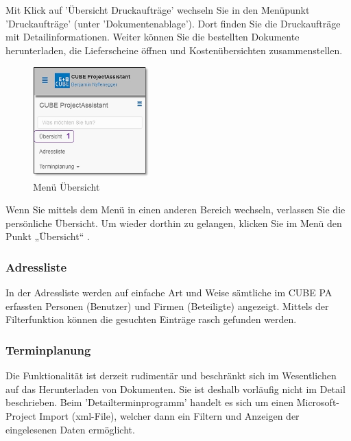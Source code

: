 Mit Klick auf 'Übersicht Druckaufträge' wechseln Sie in den Menüpunkt 'Druckaufträge' (unter 'Dokumentenablage'). Dort finden Sie die Druckaufträge mit Detailinformationen. Weiter können Sie die bestellten Dokumente herunterladen, die Lieferscheine öffnen und Kostenübersichten zusammenstellen.

\vspace{\baselineskip}

\begin{figure}
  \vspace{-30pt}
  \begin{center}
    \includegraphics[width=0.4\textwidth]{../chapters/01_Einfuehrung/pictures/1-3-2_MenuepunktUebersicht.jpg}
  \end{center}
  \vspace{-20pt}
  \caption{Menü Übersicht}
  \vspace{-10pt}
\end{figure}
Wenn Sie mittels dem Menü in einen anderen Bereich wechseln, verlassen Sie die persönliche Übersicht. Um wieder dorthin zu gelangen, klicken Sie im Menü den Punkt „Übersicht“ .

\vspace{4cm} 

\subsubsection{Adressliste}

In der Adressliste werden auf einfache Art und Weise sämtliche im CUBE PA erfassten Personen (Benutzer) und Firmen (Beteiligte) angezeigt. Mittels der Filterfunktion können die gesuchten Einträge rasch gefunden werden.

\subsubsection{Terminplanung}

Die Funktionalität ist derzeit rudimentär und beschränkt sich im Wesentlichen auf das Herunterladen von Dokumenten. Sie ist deshalb vorläufig nicht im Detail beschrieben. Beim 'Detailterminprogramm' handelt es sich um einen Microsoft-Project Import (xml-File), welcher dann ein Filtern und Anzeigen der eingelesenen Daten ermöglicht.

